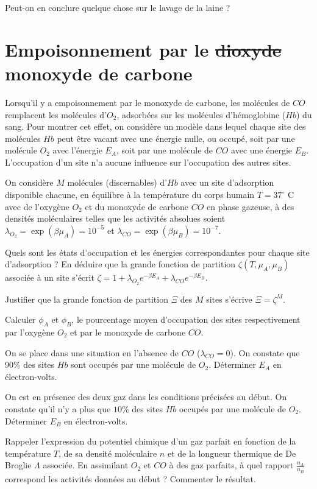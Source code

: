 \documentclass[utf8, 11pt]{feuille}
\begin{document}
\question Peut-on en conclure quelque chose sur le lavage de la laine ?

\section{Empoisonnement par le \st{dioxyde} monoxyde de carbone }

Lorsqu'il y a empoisonnement par le monoxyde de carbone, les molécules de $CO$ remplacent les molécules d'$O_2$, adsorbées sur les molécules d'hémoglobine ($Hb$) du sang. Pour montrer cet effet, on considère un modèle dans lequel chaque site des molécules $Hb$ peut être vacant avec une énergie nulle, ou occupé, soit par une molécule $O_2$ avec l'énergie $E_A$, soit par une molécule de $CO$ avec une énergie $E_B$. L'occupation d'un site n'a aucune influence sur l'occupation des autres sites.

On considère $M$ molécules (discernables) d'$Hb$ avec un site d'adsorption disponible chacune, en équilibre à la température du corps humain $T=37^{\circ} $ C avec de l'oxygène $O_2$ et du monoxyde de carbone $CO$ en phase gazeuse, à des densités moléculaires telles que les activités absolues soient $\lambda_{O_2}=\exp(\beta \mu_{A})=10^{-5}$ et $\lambda_{CO}=\exp(\beta \mu_{B})=10^{-7}$.

\medskip


\question Quels sont les états d'occupation et les énergies correspondantes pour chaque site d'adsorption ? En déduire que la grande fonction de partition $\zeta(T, \mu_A,\mu_B)$ associée à un site s'écrit $\zeta=1+\lambda_{O_2} e^{-\beta E_A} +\lambda_{CO} e^{-\beta E_B}$.

\question Justifier que la grande fonction de partition $\Xi$ des $M$ sites s'écrive $\Xi=\zeta^M$.

\question Calculer $\phi_A$ et $\phi_B$, le pourcentage moyen d'occupation  des sites respectivement par l'oxygène $O_2$ et par le monoxyde de carbone $CO$.

\question On se place dans une situation en l'absence de $CO$ ($\lambda_{CO}=0$). On constate que $90\%$ des sites $Hb$ sont occupés par une molécule de $O_2$. Déterminer $E_A$ en électron-volts.

\question On est en présence des deux gaz dans les conditions précisées au début. On constate qu'il n'y a plus que $10\%$ des sites $Hb$ occupés par une molécule de $O_2$. Déterminer $E_B$ en électron-volts.

\question Rappeler l'expression du potentiel chimique d'un gaz parfait en fonction de la température $T$, de sa densité moléculaire $n$ et de la longueur thermique de De Broglie $\Lambda$ associée. En assimilant $O_2$ et $CO$ à des gaz parfaits, à quel rapport $\frac{n_A}{n_B}$ correspond les activités données au début ? Commenter le résultat.
\end{document}

